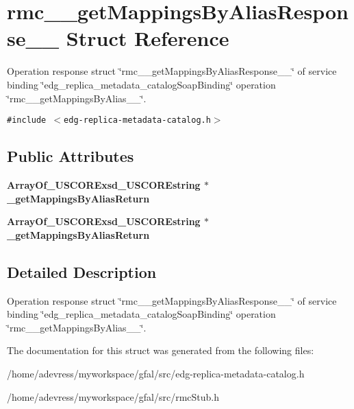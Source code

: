 \section{rmc\_\-\_\-get\-Mappings\-By\-Alias\-Response\_\-\_\- Struct Reference}
\label{structrmc____getMappingsByAliasResponse____}
Operation response struct \char`\"{}rmc\_\-\_\-get\-Mappings\-By\-Alias\-Response\_\-\_\-\char`\"{} of service binding \char`\"{}edg\_\-replica\_\-metadata\_\-catalog\-Soap\-Binding\char`\"{} operation \char`\"{}rmc\_\-\_\-get\-Mappings\-By\-Alias\_\-\_\-\char`\"{}.  


{\tt \#include $<$edg-replica-metadata-catalog.h$>$}

\subsection*{Public Attributes}
\begin{CompactItemize}
\item 
\bf{Array\-Of\_\-USCORExsd\_\-USCOREstring} $\ast$ \textbf{\_\-get\-Mappings\-By\-Alias\-Return}\label{structrmc____getMappingsByAliasResponse_____5487ba81bddb5941f83c08451713211e}

\item 
\bf{Array\-Of\_\-USCORExsd\_\-USCOREstring} $\ast$ \textbf{\_\-get\-Mappings\-By\-Alias\-Return}\label{structrmc____getMappingsByAliasResponse_____5487ba81bddb5941f83c08451713211e}

\end{CompactItemize}


\subsection{Detailed Description}
Operation response struct \char`\"{}rmc\_\-\_\-get\-Mappings\-By\-Alias\-Response\_\-\_\-\char`\"{} of service binding \char`\"{}edg\_\-replica\_\-metadata\_\-catalog\-Soap\-Binding\char`\"{} operation \char`\"{}rmc\_\-\_\-get\-Mappings\-By\-Alias\_\-\_\-\char`\"{}. 



The documentation for this struct was generated from the following files:\begin{CompactItemize}
\item 
/home/adevress/myworkspace/gfal/src/edg-replica-metadata-catalog.h\item 
/home/adevress/myworkspace/gfal/src/rmc\-Stub.h\end{CompactItemize}
